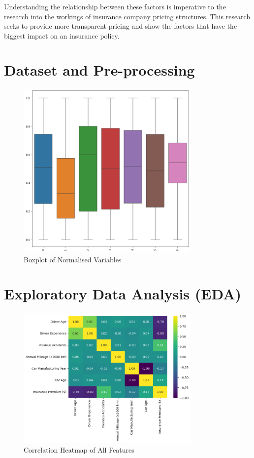 \documentclass{article}
\begin{document}
Understanding the relationship between these factors is imperative to the research into the workings of insurance company pricing structures. This research seeks to provide more transparent pricing and show the factors that have the biggest impact on an insurance policy.

\newpage
\section{Dataset and Pre-processing}

\begin{figure}[h]
\centering
\includegraphics[width=0.8\textwidth]{boxplot.png}
\caption{Boxplot of Normalised Variables}
\label{fig:boxplot}
\end{figure}

\newpage
\section{Exploratory Data Analysis (EDA)}

\begin{figure}[h]
\centering
\includegraphics[width=0.8\textwidth]{heatmap.png}
\caption{Correlation Heatmap of All Features}
\label{fig:heatmap}
\end{figure}
\end{document}
